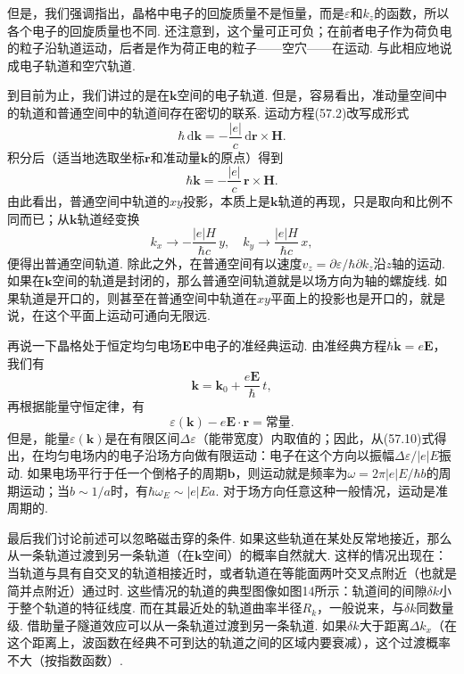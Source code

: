 但是，我们强调指出，晶格中电子的回旋质量不是恒量，而是$\varepsilon$和$k_z$的函数，所以各个电子的回旋质量也不同. 还注意到，这个量可正可负；在前者电子作为荷负电的粒子沿轨道运动，后者是作为荷正电的粒子——空穴——在运动. 与此相应地说成电子轨道和空穴轨道.

到目前为止，我们讲过的是在$\bm k$空间的电子轨道. 但是，容易看出，准动量空间中的轨道和普通空间中的轨道间存在密切的联系. 运动方程(57.2)改写成形式
\begin{equation*}
\hbar\,\mathrm d\bm k=-\frac{|e|}{c}\,\mathrm d\bm r\times\bm H.
\end{equation*}
积分后（适当地选取坐标$\bm r$和准动量$\bm k$的原点）得到
\begin{equation}
\hbar\bm k=-\frac{|e|}{c}\,\bm r\times\bm H.
\label{57.8}
\end{equation}
由此看出，普通空间中轨道的$xy$投影，本质上是$\bm k$轨道的再现，只是取向和比例不同而已；从$\bm k$轨道经变换
\begin{equation*}
k_x\to-\frac{|e|H}{\hbar c}\,y,\quad
k_y\to\frac{|e|H}{\hbar c}\,x,
\end{equation*}
便得出普通空间轨道. 除此之外，在普通空间有以速度$v_z=\partial\varepsilon/\hbar\partial k_z$沿$z$轴的运动. 如果在$\bm k$空间的轨道是封闭的，那么普通空间轨道就是以场方向为轴的螺旋线. 如果轨道是开口的，则甚至在普通空间中轨道在$xy$平面上的投影也是开口的，就是说，在这个平面上运动可通向无限远.

再说一下晶格处于恒定均匀电场$\bm E$中电子的准经典运动. 由准经典方程$\hbar\dot{\bm k}=e\bm E$，我们有
\begin{equation}
\bm k=\bm k_0+\frac{e\bm E}{\hbar}\,t,
\label{57.9}
\end{equation}
再根据能量守恒定律，有
\begin{equation}
\varepsilon(\bm k)-e\bm E\cdot\bm r=\text{常量}.
\label{57.10}
\end{equation}
但是，能量$\varepsilon(\bm k)$是在有限区间$\Delta\varepsilon$（能带宽度）内取值的；因此，从(57.10)式得出，在均匀电场内的电子沿场方向做有限运动：电子在这个方向以振幅$\Delta\varepsilon/|e|E$振动. 如果电场平行于任一个倒格子的周期$\bm b$，则运动就是频率为$\omega=2\pi|e|E/\hbar b$的周期运动；当$b\sim1/a$时，有$\hbar\omega_E\sim|e|Ea$. 对于场方向任意这种一般情况，运动是准周期的.

最后我们讨论前述可以忽略磁击穿的条件. 如果这些轨道在某处反常地接近，那么从一条轨道过渡到另一条轨道（在$\bm k$空间）的概率自然就大. 这样的情况出现在：当轨道与具有自交叉的轨道相接近时，或者轨道在等能面两叶交叉点附近（也就是简并点附近）通过时. 这些情况的轨道的典型图像如图14所示：轨道间的间隙$\delta k$小于整个轨道的特征线度. 而在其最近处的轨道曲率半径$R_k$，一般说来，与$\delta k$同数量级. 借助量子隧道效应可以从一条轨道过渡到另一条轨道. 如果$\delta k$大于距离$\Delta k_x$（在这个距离上，波函数在经典不可到达的轨道之间的区域内要衰减），这个过渡概率不大（按指数函数）.

